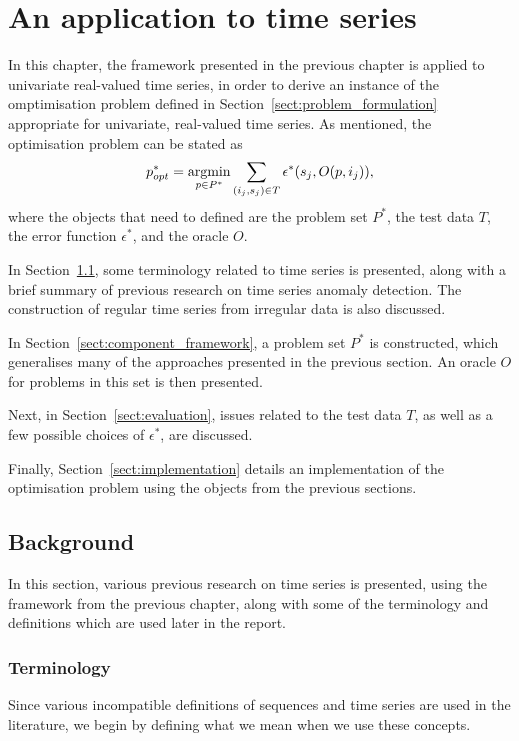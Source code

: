 \chapter{An application to time series}
\label{ch:time_series}

In this chapter, the framework presented in the previous chapter is applied to univariate real-valued time series, in order to derive an instance of the omptimisation problem defined in Section~\ref{sect:problem_formulation} appropriate for univariate, real-valued time series. As mentioned, the optimisation problem can be stated as
\[
    p^*_{opt} = \argmin_{p \in P^*} \sum_{(i_j, s_j) \in T} \epsilon^*(s_j, O(p, i_j)),
\]
where the objects that need to defined are the problem set $P^*$, the test data $T$, the error function $\epsilon^*$, and the oracle $O$.

In Section~\ref{sect:background}, some terminology related to time series is presented, along with a brief summary of previous research on time series anomaly detection. The construction of regular time series from irregular data is also discussed.

In Section~\ref{sect:component_framework}, a problem set $P^*$ is constructed, which generalises many of the approaches presented in the previous section. An oracle $O$ for problems in this set is then presented.

Next, in Section~\ref{sect:evaluation}, issues related to the test data $T$, as well as a few possible choices of $\epsilon^*$, are discussed.

Finally, Section~\ref{sect:implementation} details an implementation of the optimisation problem using the objects from the previous sections.

\section{Background}
\label{sect:background}

In this section, various previous research on time series is presented, using the framework from the previous chapter, along with some of the terminology and definitions which are used later in the report.

\subsection{Terminology}
\label{sect:terminology}

Since various incompatible definitions of sequences and time series are used in the literature, we begin by defining what we mean when we use these concepts.

